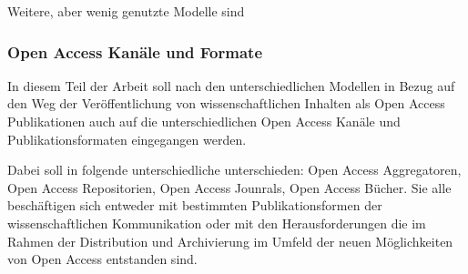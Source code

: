 Weitere, aber wenig genutzte Modelle sind

\subsubsection{Open Access Kanäle und Formate}
In diesem Teil der Arbeit soll nach den unterschiedlichen Modellen in Bezug auf den Weg der Veröffentlichung von wissenschaftlichen Inhalten als Open Access Publikationen auch auf die unterschiedlichen Open Access Kanäle und Publikationsformaten eingegangen werden.

Dabei soll in folgende unterschiedliche unterschieden: Open Access Aggregatoren, Open Access Repositorien, Open Access Jounrals, Open Access Bücher. Sie alle beschäftigen sich entweder mit bestimmten Publikationsformen der wissenschaftlichen Kommunikation oder mit den Herausforderungen die im Rahmen der Distribution und Archivierung im Umfeld der neuen Möglichkeiten von Open Access entstanden sind. 